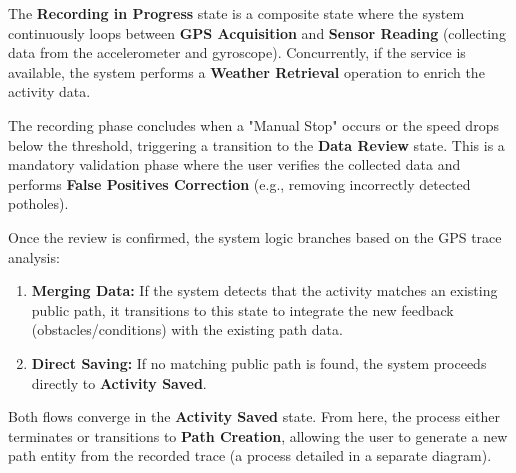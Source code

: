 The \textbf{Recording in Progress} state is a composite state where the system continuously loops between \textbf{GPS Acquisition} and \textbf{Sensor Reading} (collecting data from the accelerometer and gyroscope). Concurrently, if the service is available, the system performs a \textbf{Weather Retrieval} operation to enrich the activity data.

The recording phase concludes when a "Manual Stop" occurs or the speed drops below the threshold, triggering a transition to the \textbf{Data Review} state. This is a mandatory validation phase where the user verifies the collected data and performs \textbf{False Positives Correction} (e.g., removing incorrectly detected potholes).

Once the review is confirmed, the system logic branches based on the GPS trace analysis: \begin{enumerate} \item \textbf{Merging Data:} If the system detects that the activity matches an existing public path, it transitions to this state to integrate the new feedback (obstacles/conditions) with the existing path data. \item \textbf{Direct Saving:} If no matching public path is found, the system proceeds directly to \textbf{Activity Saved}. \end{enumerate}

Both flows converge in the \textbf{Activity Saved} state. From here, the process either terminates or transitions to \textbf{Path Creation}, allowing the user to generate a new path entity from the recorded trace (a process detailed in a separate diagram).

